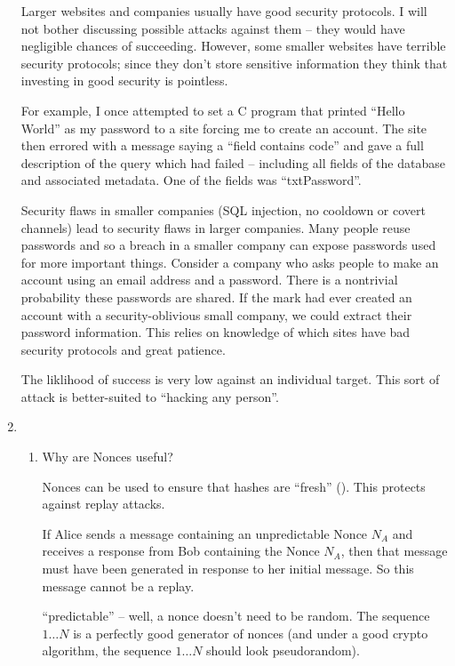 \documentclass[10pt,\jkfside,a4paper]{article}
\begin{document}
\begin{enumerate}
Larger websites and companies usually have good security protocols. I will not bother discussing possible 
attacks against them -- they would have negligible chances of succeeding. However, some smaller websites 
have terrible security protocols; since they don't store sensitive information they think that investing 
in good security is pointless. 

For example, I once attempted to set a C program that printed ``Hello World'' as my password to 
a site forcing me to create an account. The site then errored with a message saying a ``field 
contains code'' and gave a full description of the query which had failed -- including all fields 
of the database and associated metadata. One of the fields was ``txtPassword''.

Security flaws in smaller companies (SQL injection, no cooldown or covert channels) lead to security 
flaws in larger companies. Many people reuse passwords and so a breach in a smaller company can 
expose passwords used for more important things. Consider a company who asks people to make an 
account using an email address and a password. There is a nontrivial probability these passwords are 
shared. If the mark had ever created an account with a security-oblivious small company, we could extract 
their password information. This relies on knowledge of which sites have bad security protocols and 
great patience. 

The liklihood of success is very low against an individual target. This sort of attack is better-suited 
to ``hacking any person''.

\item 

\begin{enumerate}

\item Why are Nonces useful?

Nonces can be used to ensure that hashes are ``fresh'' (\dag). This protects against replay attacks.

If Alice sends a message containing an unpredictable Nonce $N_A$ and receives a response from Bob 
containing the Nonce $N_A$, then that message must have been generated in response to her initial 
message. So this message cannot be a replay.

{\color{blue} ``predictable'' -- well, a nonce doesn't need to be random. The sequence $1 \dots N$ is
a perfectly good generator of nonces (and under a good crypto algorithm, the sequence $1 \dots N$ should look
pseudorandom).}


\end{enumerate}
\end{enumerate}
\end{document}
